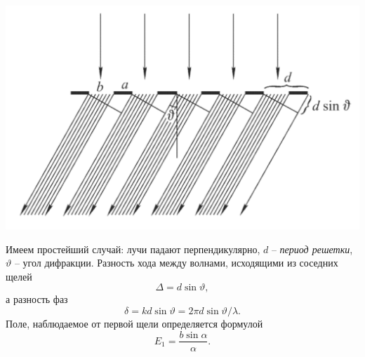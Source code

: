 
\begin{minipage}{0.45\textwidth}
    \includegraphics[width=1\textwidth]{figures/s36_1.png}
\end{minipage}
\hfill
\begin{minipage}{0.45\textwidth}
	Имеем простейший случай: лучи падают перпендикулярно, $d$ -- \textit{период решетки}, $\vartheta$ -- угол дифракции.
	Разность хода между волнами, исходящими из соседних щелей 
	\begin{equation*}
		\Delta = d \sin \vartheta, 	
	\end{equation*}
	а разность фаз 
	\begin{equation*}
		\delta = k d \sin \vartheta = 2 \pi d \sin \vartheta / \lambda.
	\end{equation*}  
	Поле, наблюдаемое от первой щели определяется формулой
	\begin{equation*}
		E_1 = \frac{b \sin\alpha}{\alpha}.
	\end{equation*}
\end{minipage}

